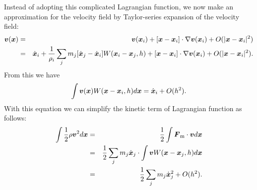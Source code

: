 \documentclass{cjour}
\newcommand{ \Vec   }[1]{ \mbox{\boldmath $ #1 $} }
\begin{document}
\begin{article}
Instead of adopting this complicated Lagrangian function,  
we now make an approximation for the velocity field 
by Taylor-series expansion of the velocity field: 
\begin{eqnarray}
       \Vec{v}(\Vec{x}) & = & \Vec{v}(\Vec{x}_i) 
                  + [\Vec{x}-\Vec{x}_i] \cdot \nabla \Vec{v}(\Vec{x}_i)
                  + O(|\Vec{x}-\Vec{x}_i|^2)  
                                                   \\ \nonumber
       & = &    \dot{\Vec{x}}_i  
              + \frac{1}{\rho_i}
                \sum_{j} m_{j} [ \dot{\Vec{x}}_j - \dot{\Vec{x}}_i ]
                               W(\Vec{x}_i - \Vec{x}_{j} , h ) 
              + [\Vec{x}-\Vec{x}_i] \cdot \nabla \Vec{v}(\Vec{x}_i)
              + O(|\Vec{x}-\Vec{x}_i|^2) . 
                                                     \label{eq:evf}
\end{eqnarray}
From this we have 
\begin{equation}
       \int \Vec{v}(\Vec{x}) W(\Vec{x}-\Vec{x}_i,h) d\Vec{x}
                   = \dot{\Vec{x}}_i  
                     + O(h^2) . 
                                                     \label{eq:Aov}
\end{equation}
With this equation we can simplify the kinetic term of Lagrangian 
function as follows:
\begin{eqnarray}
                \int \frac{1}{2} \rho \Vec{v}^2 d\Vec{x}
  & = & \frac{1}{2} \int \Vec{F}_{\rm m} \cdot \Vec{v} d\Vec{x}
                                                   \nonumber \\
  & = & \frac{1}{2} \sum_{j} m_{j} \dot{\Vec{x}}_j \cdot
        \int \Vec{v}W (\Vec{x} - \Vec{x}_{j} , h ) d\Vec{x}
                                                   \nonumber \\
  & = & \frac{1}{2} \sum_{j} m_{j} \dot{\Vec{x}}_j^2 + O(h^2) .
\end{eqnarray}


\end{article}
\end{document}
